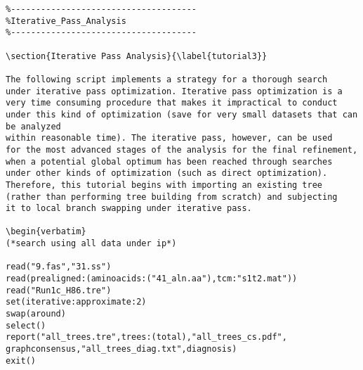 \begin{verbatim}
%-------------------------------------
%Iterative_Pass_Analysis
%-------------------------------------

\section{Iterative Pass Analysis}{\label{tutorial3}}

The following script implements a strategy for a thorough search
under iterative pass optimization. Iterative pass optimization is a 
very time consuming procedure that makes it impractical to conduct 
under this kind of optimization (save for very small datasets that can be analyzed
within reasonable time). The iterative pass, however, can be used
for the most advanced stages of the analysis for the final refinement,
when a potential global optimum has been reached through searches
under other kinds of optimization (such as direct optimization).
Therefore, this tutorial begins with importing an existing tree
(rather than performing tree building from scratch) and subjecting 
it to local branch swapping under iterative pass.

\begin{verbatim}
(*search using all data under ip*)

read("9.fas","31.ss")
read(prealigned:(aminoacids:("41_aln.aa"),tcm:"s1t2.mat"))
read("Run1c_H86.tre")
set(iterative:approximate:2)
swap(around)
select()
report("all_trees.tre",trees:(total),"all_trees_cs.pdf",
graphconsensus,"all_trees_diag.txt",diagnosis)
exit()
\end{verbatim}

